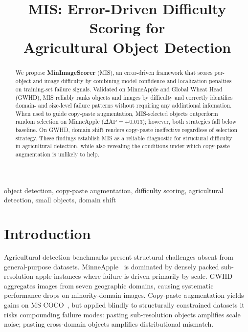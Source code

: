 \documentclass[conference]{IEEEtran}
\begin{document}
\title{MIS: Error-Driven Difficulty Scoring for\\ Agricultural Object Detection}

\author{
}

\maketitle

\begin{abstract}
We propose \textbf{MinImageScorer} (MIS), an error-driven framework
that scores per-object and image difficulty by combining model
confidence and localization penalties on training-set failure signals.
Validated on MinneApple and Global Wheat Head (GWHD), MIS reliably
ranks objects and images by difficulty and
correctly identifies domain- and size-level failure patterns
without requiring any addintional infomation.
When used to guide copy-paste augmentation, MIS-selected objects
outperform random selection on MinneApple ($\Delta\mathrm{AP}{=}
{+}0.013$); however, both strategies fall below baseline.
On GWHD, domain shift renders copy-paste ineffective regardless of
selection strategy.
These findings establish MIS as a reliable diagnostic for structural
difficulty in agricultural detection, while also revealing the
conditions under which copy-paste augmentation is unlikely to help.
\end{abstract}

\begin{IEEEkeywords}
object detection, copy-paste augmentation, difficulty scoring,
agricultural detection, small objects, domain shift
\end{IEEEkeywords}

\vspace{-11px}
\section{Introduction}
Agricultural detection benchmarks present structural challenges absent
from general-purpose datasets. MinneApple~\cite{hani2020minneapple}
is dominated by densely packed sub-resolution apple instances where
failure is driven primarily by scale. GWHD~\cite{david2021global}
aggregates images from seven geographic domains, causing systematic
performance drops on minority-domain images. Copy-paste augmentation
yields gains on MS COCO~\cite{kisantal2019augmentation,ghiasi2021simple},
but applied blindly to structurally constrained datasets it risks
compounding failure modes: pasting sub-resolution objects amplifies
scale noise; pasting cross-domain objects amplifies distributional
mismatch.
\end{document}
